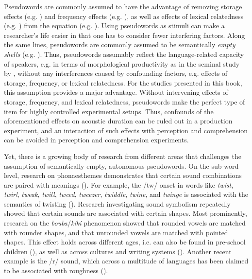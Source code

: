 Pseudowords are commonly assumed to have the advantage of removing storage effects (e.g. \cite{Caselli2016}) and frequency effects (e.g. \cite{Gahl2008, Lohmann2018}), as well as effects of lexical relatedness (e.g. \cite{Schriefers1998}) from the equation (e.g. \cite{Turcsan2015}). Using pseudowords as stimuli can make a researcher’s life easier in that one has to consider fewer interfering factors. Along the same lines, pseudowords are commonly assumed to be semantically \textit{empty shells} (e.g. \cite{Guenther1983, Frisch2000, Turcsan2015}). Thus, pseudowords assumably reflect the language-related capacity of speakers, e.g. in terms of morphological productivity as in the seminal study by \citet{Berko1958}, without any interferences caused by confounding factors, e.g. effects of storage, frequency, or lexical relatedness. For the studies presented in this book, this assumption provides a major advantage. Without intervening effects of storage, frequency, and lexical relatedness, pseudowords make the perfect type of item for highly controlled experimental setups. Thus, confounds of the aforementioned effects on acoustic duration can be ruled out in a production experiment, and an interaction of such effects with perception and comprehension can be avoided in perception and comprehension experiments.

Yet, there is a growing body of research from different areas that challenges the assumption of semantically empty, autonomous pseudowords. On the sub-word level, research on phonaesthemes demonstrates that certain sound combinations are paired with meanings (\cite{Bergen2004, Kwon2015}). For example, the /tw/ onset in words like \textit{twist}, \textit{twirl}, \textit{tweak}, \textit{twill}, \textit{tweed}, \textit{tweezer}, \textit{twiddle}, \textit{twine}, and \textit{twinge} is associated with the semantics of twisting (\cite{Bolinger1950}). Research investigating sound symbolism repeatedly showed that certain sounds are associated with certain shapes. Most prominently, research on the \textit{bouba}/\textit{kiki} phenomenon showed that rounded vowels are matched with rounder shapes, and that unrounded vowels are matched with pointed shapes. This effect holds across different ages, i.e. can also be found in pre-school children (\cite{Maurer2006}), as well as across cultures and writing systems (\cite{Cwiek2022}). Another recent example is the /r/ sound, which across a multitude of languages has been claimed to be associated with roughness (\cite{Winter2022}).

